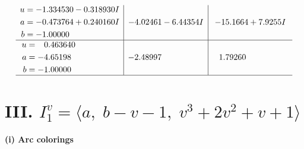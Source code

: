 \documentclass[1p]{elsarticle_modified}
\theoremstyle{definition}
\begin{document}
$$\begin{array}{c|c|c}
\begin{aligned}
u &= -1.334530 - 0.318930 I \\
a &= -0.473764 + 0.240160 I \\
b &= -1.00000\phantom{ +0.000000I}\end{aligned}
 & -4.02461 - 6.44354 I & -15.1664 + 7.9255 I \\ \hline\begin{aligned}
u &= \phantom{-}0.463640\phantom{ +0.000000I} \\
a &= -4.65198\phantom{ +0.000000I} \\
b &= -1.00000\phantom{ +0.000000I}\end{aligned}
 & -2.48997\phantom{ +0.000000I} & \phantom{-}1.79260\phantom{ +0.000000I}\\
 \hline 
 \end{array}$$\newpage\newpage\renewcommand{\arraystretch}{1}
\centering \section*{III. $I^v_{1}= \langle a,\;b- v-1,\;v^3+2 v^2+v+1 \rangle$}
\flushleft \textbf{(i) Arc colorings}\\
\end{document}
